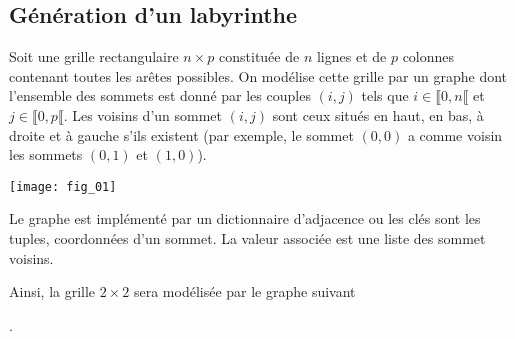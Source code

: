 %
\setcounter{numques}{0}


\subsection*{Génération d'un labyrinthe}

Soit une grille rectangulaire $n\times p$ constituée de $n$ lignes et de $p$ colonnes contenant toutes les arêtes possibles. On modélise cette grille par un graphe dont l'ensemble des sommets est donné par les couples $(i,j)$ tels que $i\in\llbracket 0,n \llbracket $ et $j\in\llbracket 0,p \llbracket $. Les voisins d'un sommet $(i,j)$ sont ceux situés en haut, en bas, à droite et à gauche s'ils existent (par exemple, le sommet $(0,0)$ a comme voisin les sommets $(0,1)$ et $(1,0)$).

\begin{center}
\texttt{[image: fig\_01]}
\end{center}

Le graphe est implémenté par un dictionnaire d'adjacence ou les clés sont les tuples, coordonnées d'un sommet. La valeur associée est une liste des sommet voisins. 


Ainsi, la grille $ 2 \times 2$ sera modélisée par le graphe suivant

.
